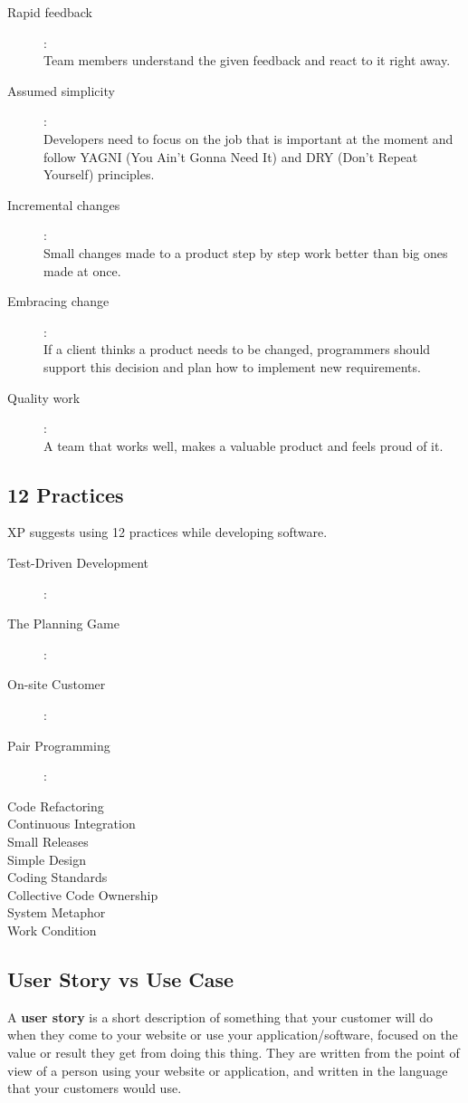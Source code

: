 \begin{minipage}[t]{0.5\linewidth}
\begin{description}
\item [Rapid feedback]:\\
Team members understand the given feedback and react to it right away.
\item [Assumed simplicity]:\\
Developers need to focus on the job that is important at the moment and
follow YAGNI (You Ain't Gonna Need It) and DRY (Don't Repeat Yourself)
principles.
\item [Incremental changes]:\\
Small changes made to a product step by step work better than big ones made at
once.
\item [Embracing change]:\\
If a client thinks a product needs to be changed, programmers should support
this decision and plan how to implement new requirements.
\item [Quality work]:\\
A team that works well, makes a valuable product and feels proud of it.
\end{description}


\subsection{12 Practices}
XP suggests using 12 practices while developing software.

\begin{description}
\item [Test-Driven Development]:
\item [The Planning Game]:
\item [On-site Customer]:
\item [Pair Programming]:
\item [Code Refactoring]
\item [Continuous Integration]
\item [Small Releases]
\item [Simple Design]
\item [Coding Standards]
\item [Collective Code Ownership]
\item [System Metaphor]
\item [Work Condition]
\end{description}
%
\newpage
\subsection{User Story vs Use Case}
A \textbf{user story} is a short description of something that your customer will
do when they come to your website or use your application/software,
focused on the value or result they get from doing this thing. They are
written from the point of view of a person using your website or application,
and written in the language that your customers would use.\\


\end{minipage}
